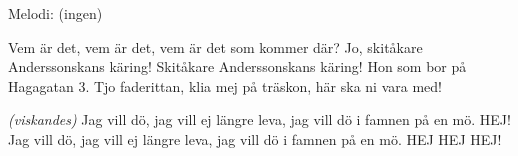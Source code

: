 \begin{song}

\begin{songmeta}
Melodi: (ingen)
\end{songmeta}

\begin{songtext}
Vem är det, vem är det, vem är det som kommer där?
Jo, skitåkare Anderssonskans käring!
Skitåkare Anderssonskans käring!
Hon som bor på Hagagatan 3.
Tjo faderittan, klia mej på träskon,
här ska ni vara med!

\textit{(viskandes)}
Jag vill dö, jag vill ej längre leva,
jag vill dö i famnen på en mö. HEJ!
Jag vill dö, jag vill ej längre leva,
jag vill dö i famnen på en mö. HEJ HEJ HEJ!

\end{songtext}
\end{song}
